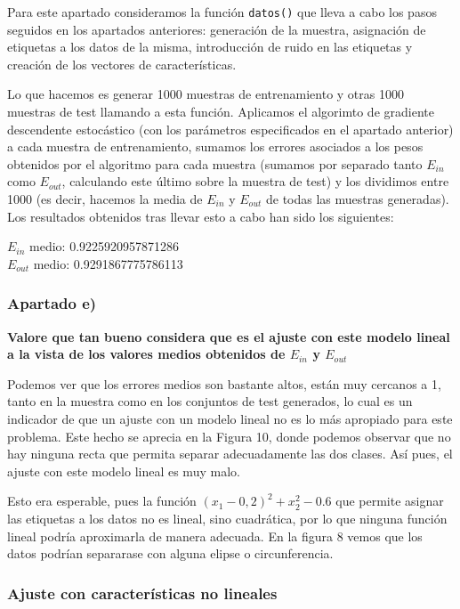 \documentclass[a4]{article}
\begin{document}
Para este apartado consideramos la función \lstinline|datos()| que lleva a cabo los pasos seguidos en los apartados anteriores: generación de la muestra, asignación de etiquetas a los datos de la misma, introducción de ruido en las etiquetas y creación de los vectores de características. 	

Lo que hacemos es generar 1000 muestras de entrenamiento y otras 1000 muestras de test llamando a esta función. Aplicamos el algorimto de gradiente descendente estocástico (con los parámetros especificados en el apartado anterior) a cada muestra de entrenamiento, sumamos los errores asociados a los pesos obtenidos por el algoritmo para cada muestra (sumamos por separado tanto $E_{in}$ como $E_{out}$, calculando este último sobre la muestra de test) y los dividimos entre 1000 (es decir, hacemos la media de $E_{in}$ y $E_{out}$ de todas las muestras generadas). Los resultados obtenidos tras llevar esto a cabo han sido los siguientes:
\begin{center}
$E_{in}$ medio: 0.9225920957871286 \\
$E_{out}$ medio: 0.9291867775786113
\end{center}

\subsubsection{Apartado e)}
\textbf{Valore que tan bueno considera que es el ajuste con este modelo lineal a la vista
de los valores medios obtenidos de $E_{in}$ y $E_{out}$}

Podemos ver que los errores medios son bastante altos, están muy cercanos a 1, tanto en la muestra como en los conjuntos de test generados, lo cual es un indicador de que un ajuste con un modelo lineal no es lo más apropiado para este problema. Este hecho se aprecia en la Figura 10, donde podemos observar que no hay ninguna recta que permita separar adecuadamente las dos clases. Así pues, el ajuste con este modelo lineal es muy malo. 

Esto era esperable, pues la función $(x_1 - 0,2)^2 + x_2^2 - 0.6$ que permite asignar las etiquetas a los datos no es lineal, sino cuadrática, por lo que ninguna función lineal podría aproximarla de manera adecuada. En la figura 8 vemos que los datos podrían separarase con alguna elipse o circunferencia.  

\subsubsection{Ajuste con características no lineales}
\end{document}

